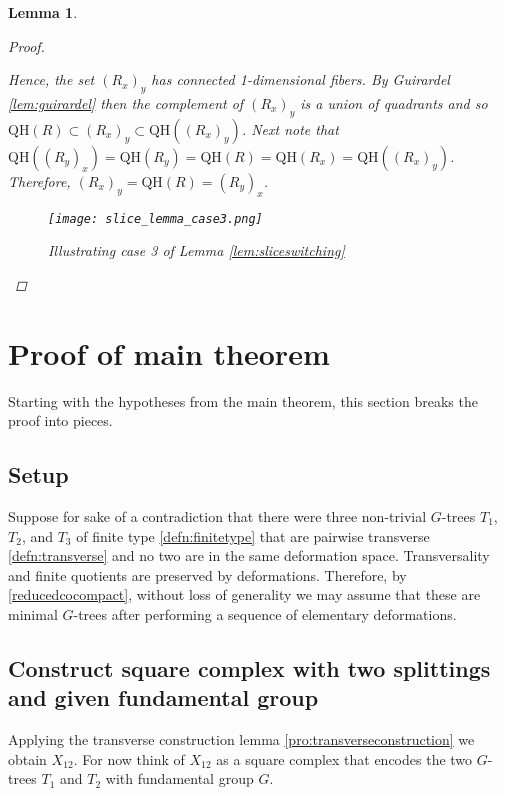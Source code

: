 \documentclass[12pt,parskip=full]{report}
\theoremstyle{plain}
\newtheorem{lem}[thm]{Lemma}
\theoremstyle{definition}
\newcommand{\rxy}{(R_x)_y}
\newcommand{\ryx}{(R_y)_x}
\begin{document}
\begin{lem}
\begin{proof}
\begin{enumerate}
        \end{enumerate}
        Hence, the set $\rxy$ has connected 1-dimensional fibers. By Guirardel \ref{lem:guirardel} then the complement of $\rxy$ is a union of quadrants and so $\text{QH}(R)\subset \rxy\subset \text{QH}(\rxy)$. Next note that $\text{QH}((R_y)_x)=\text{QH}(R_y)=\text{QH}(R)=\text{QH}(R_x)=\text{QH}((R_x)_y)$. Therefore, $\rxy =\text{QH}(R)=\ryx$.
        
        
        
        \begin{figure}[htp]
    \centering
    \texttt{[image: slice\_lemma\_case3.png]}
    \caption{Illustrating case 3 of Lemma \ref{lem:sliceswitching}}
    \label{fig:square}
\end{figure}
        
        
        
                  
    \end{proof}
\end{lem}

\chapter{Proof of main theorem}

Starting with the hypotheses from the main theorem, this section breaks the proof into pieces.

\section{Setup}

Suppose for sake of a contradiction that there were three non-trivial \(G\)-trees \(T_{1}\), \(T_{2}\), and \(T_{3}\) of finite type \ref{defn:finitetype} that are pairwise transverse \ref{defn:transverse} and no two are in the same deformation space. Transversality and finite quotients are preserved by deformations. Therefore, by \ref{reducedcocompact}, without loss of generality we may assume that these are minimal \(G\)-trees after performing a sequence of elementary deformations. 

\section{Construct square complex with two splittings and given fundamental group}

Applying the transverse construction lemma \ref{pro:transverseconstruction} we obtain \(X_{12}\). For now think of $X_{12}$ as a square complex that encodes the two $G$-trees $T_1$ and $T_2$ with fundamental group $G$.
\end{document}
